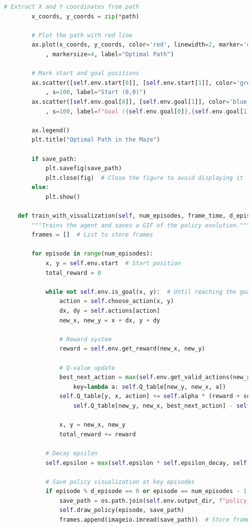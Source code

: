 \documentclass[11pt]{article}
\begin{document}
\begin{lstlisting}[language=Python]
        # Extract X and Y coordinates from path
        x_coords, y_coords = zip(*path)

        # Plot the path with red line
        ax.plot(x_coords, y_coords, color='red', linewidth=2, marker='o'
            , markersize=4, label="Optimal Path")

        # Mark start and goal positions
        ax.scatter([self.env.start[0]], [self.env.start[1]], color='green'
            , s=100, label="Start (0,0)")
        ax.scatter([self.env.goal[0]], [self.env.goal[1]], color='blue'
            , s=100, label=f"Goal ({self.env.goal[0]},{self.env.goal[1]})")

        ax.legend()
        plt.title("Optimal Path in the Maze")

        if save_path:
            plt.savefig(save_path)
            plt.close(fig)  # Close the figure to avoid displaying it
        else:
            plt.show()

    def train_with_visualization(self, num_episodes, frame_time, d_episode):
        """Trains the agent and saves a GIF of the policy evolution."""
        frames = []  # List to store frames

        for episode in range(num_episodes):
            x, y = self.env.start  # Start position
            total_reward = 0

            while not self.env.is_goal(x, y):  # Until reaching the goal
                action = self.choose_action(x, y)
                dx, dy = self.actions[action]
                new_x, new_y = x + dx, y + dy

                # Reward system
                reward = self.env.get_reward(new_x, new_y)

                # Q-value update
                best_next_action = max(self.env.get_valid_actions(new_x, new_y), 
                    key=lambda a: self.Q_table[new_y, new_x, a])
                self.Q_table[y, x, action] += self.alpha * (reward + self.gamma * 
                    self.Q_table[new_y, new_x, best_next_action] - self.Q_table[y, x, action])

                x, y = new_x, new_y
                total_reward += reward

            # Decay epsilon
            self.epsilon = max(self.epsilon * self.epsilon_decay, self.epsilon_min)

            # Save policy visualization at key episodes
            if episode % d_episode == 0 or episode == num_episodes - 1:
                save_path = os.path.join(self.env.output_dir, f"policy_episode_{episode}.png")
                self.draw_policy(episode, save_path)
                frames.append(imageio.imread(save_path))  # Store frame


\end{lstlisting}
\end{document}
